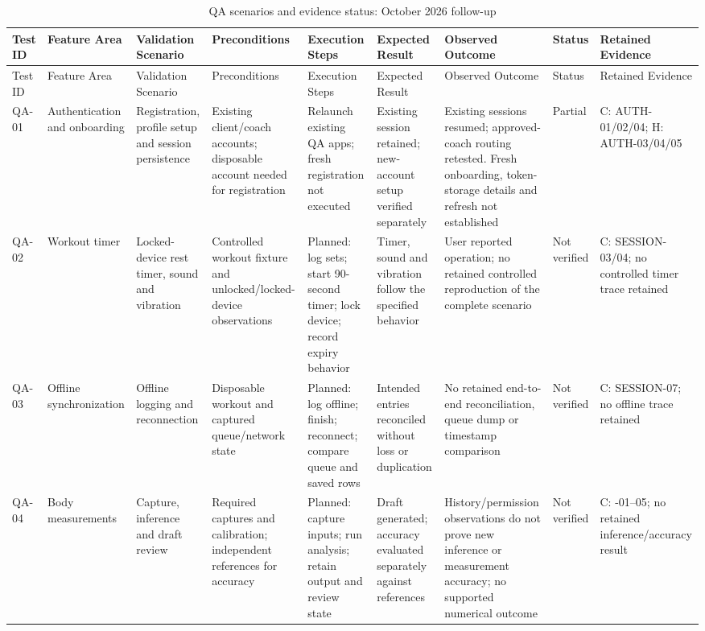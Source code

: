 \documentclass[12pt,a4paper,openany]{report}
\begin{document}
\begingroup
\scriptsize
\setlength{\tabcolsep}{2pt}
\renewcommand{\arraystretch}{1.20}
\setlength{\LTpre}{5pt}
\setlength{\LTpost}{10pt}
\begin{longtable}{|L{1.20cm}|L{1.50cm}|L{1.60cm}|L{1.60cm}|L{1.80cm}|L{1.80cm}|L{1.65cm}|L{1.35cm}|L{2.00cm}|}
\caption{QA scenarios and evidence status: October 2026 follow-up}\label{tab:pdf-113-56} \\
\hline
{}
Test ID & Feature Area & Validation Scenario & Preconditions & Execution Steps & Expected Result & Observed Outcome & Status & Retained Evidence \\ \hline
\endfirsthead
\hline
{}
Test ID & Feature Area & Validation Scenario & Preconditions & Execution Steps & Expected Result & Observed Outcome & Status & Retained Evidence \\ \hline
\endhead
QA-01 & Authentication and onboarding & Registration, profile setup and session persistence & Existing client\slash{}coach accounts; disposable account needed for registration & Relaunch existing QA apps; fresh registration not executed & Existing session retained; new-account setup verified separately & Existing sessions resumed; approved-coach routing retested. Fresh onboarding, token-storage details and refresh not established & Partial & C: AUTH-01\slash{}02\slash{}04; H: AUTH-03\slash{}04\slash{}05 \\ \hline
QA-02 & Workout timer & Locked-device rest timer, sound and vibration & Controlled workout fixture and unlocked\slash{}locked-device observations & Planned: log sets; start 90-second timer; lock device; record expiry behavior & Timer, sound and vibration follow the specified behavior & User reported operation; no retained controlled reproduction of the complete scenario & Not verified & C: SESSION-03\slash{}04; no controlled timer trace retained \\ \hline
QA-03 & Offline synchronization & Offline logging and reconnection & Disposable workout and captured queue\slash{}network state & Planned: log offline; finish; reconnect; compare queue and saved rows & Intended entries reconciled without loss or duplication & No retained end-to-end reconciliation, queue dump or timestamp comparison & Not verified & C: SESSION-07; no offline trace retained \\ \hline
QA-04 & Body measurements & Capture, inference and draft review & Required captures and calibration; independent references for accuracy & Planned: capture inputs; run analysis; retain output and review state & Draft generated; accuracy evaluated separately against references & History\slash{}permission observations do not prove new inference or measurement accuracy; no supported numerical outcome & Not verified & C: -01--05; no retained inference\slash{}accuracy result \\ \hline

\end{longtable}
\end{document}
